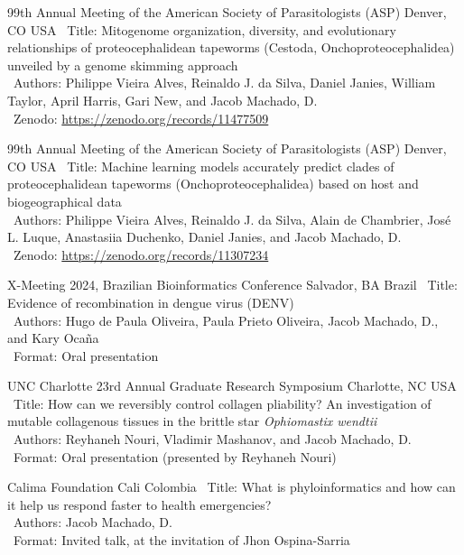 \documentclass[11pt, letterpaper, sans]{moderncv}
\begin{document}
    {99th Annual Meeting of the American Society of Parasitologists (ASP)}
    {Denver, CO}
    {USA}
    {}
    {
        \textbullet~Title: Mitogenome organization, diversity, and evolutionary relationships of proteocephalidean tapeworms (Cestoda, Onchoproteocephalidea) unveiled by a genome skimming approach\\
        \textbullet~Authors: Philippe Vieira Alves, Reinaldo J. da Silva, Daniel Janies, William Taylor, April Harris, Gari New, and Jacob Machado, D.\\
        \textbullet~Zenodo: \url{https://zenodo.org/records/11477509}
    }

\cventry{---}
    {99th Annual Meeting of the American Society of Parasitologists (ASP)}
    {Denver, CO}
    {USA}
    {}
    {
        \textbullet~Title: Machine learning models accurately predict clades of proteocephalidean tapeworms (Onchoproteocephalidea) based on host and biogeographical data\\
        \textbullet~Authors: Philippe Vieira Alves, Reinaldo J. da Silva, Alain de Chambrier, José L. Luque, Anastasiia Duchenko, Daniel Janies, and Jacob Machado, D.\\
        \textbullet~Zenodo: \url{https://zenodo.org/records/11307234}
    }

    {X-Meeting 2024, Brazilian Bioinformatics Conference}
    {Salvador, BA}
    {Brazil}
    {}
    {
        \textbullet~Title: Evidence of recombination in dengue virus (DENV)\\
        \textbullet~Authors: Hugo de Paula Oliveira, Paula Prieto Oliveira, Jacob Machado, D., and Kary Ocaña\\
        \textbullet~Format: Oral presentation
    }

    {UNC Charlotte 23rd Annual Graduate Research Symposium}
    {Charlotte, NC}
    {USA}
    {}
    {
        \textbullet~Title: How can we reversibly control collagen pliability? An investigation of mutable collagenous tissues in the brittle star \textit{Ophiomastix wendtii}\\
        \textbullet~Authors: Reyhaneh Nouri, Vladimir Mashanov, and Jacob Machado, D.\\
        \textbullet~Format: Oral presentation (presented by Reyhaneh Nouri)
    }

    {Calima Foundation}
    {Cali}
    {Colombia}
    {}
    {
        \textbullet~Title: What is phyloinformatics and how can it help us respond faster to health emergencies?\\
        \textbullet~Authors: Jacob Machado, D.\\
        \textbullet~Format: Invited talk, at the invitation of Jhon Ospina-Sarria
    }
\end{document}
